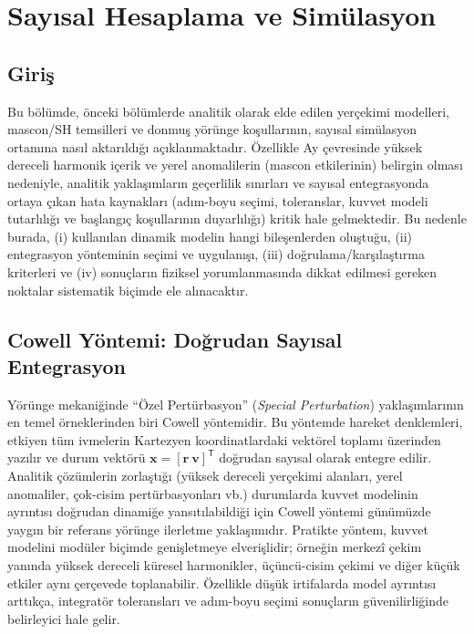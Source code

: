 \chapter{Sayısal Hesaplama ve Simülasyon}

\section{Giriş}
Bu bölümde, önceki bölümlerde analitik olarak elde edilen yerçekimi modelleri, mascon/SH temsilleri ve donmuş
yörünge koşullarının, sayısal simülasyon ortamına nasıl aktarıldığı açıklanmaktadır. Özellikle Ay çevresinde
yüksek dereceli harmonik içerik ve yerel anomalilerin (mascon etkilerinin) belirgin olması nedeniyle, analitik
yaklaşımların geçerlilik sınırları ve sayısal entegrasyonda ortaya çıkan hata kaynakları (adım-boyu seçimi,
toleranslar, kuvvet modeli tutarlılığı ve başlangıç koşullarının duyarlılığı) kritik hale gelmektedir.
Bu nedenle burada, (i) kullanılan dinamik modelin hangi bileşenlerden oluştuğu, (ii) entegrasyon yönteminin
seçimi ve uygulanışı, (iii) doğrulama/karşılaştırma kriterleri ve (iv) sonuçların fiziksel yorumlanmasında
dikkat edilmesi gereken noktalar sistematik biçimde ele alınacaktır.




\newpage
\section{Cowell Yöntemi: Doğrudan Sayısal Entegrasyon}

Yörünge mekaniğinde ``Özel Pertürbasyon'' (\textit{Special Perturbation}) yaklaşımlarının en temel örneklerinden biri
Cowell yöntemidir. Bu yöntemde hareket denklemleri, etkiyen tüm ivmelerin Kartezyen koordinatlardaki vektörel toplamı
üzerinden yazılır ve durum vektörü $\mathbf{x}=[\mathbf{r}\ \mathbf{v}]^{\mathsf T}$ doğrudan sayısal olarak entegre edilir.
Analitik çözümlerin zorlaştığı (yüksek dereceli yerçekimi alanları, yerel anomaliler, çok-cisim pertürbasyonları vb.)
durumlarda kuvvet modelinin ayrıntısı doğrudan dinamiğe yansıtılabildiği için Cowell yöntemi günümüzde yaygın bir
referans yörünge ilerletme yaklaşımıdır. Pratikte yöntem, kuvvet modelini modüler biçimde genişletmeye elverişlidir;
örneğin merkezî çekim yanında yüksek dereceli küresel harmonikler, üçüncü-cisim çekimi ve diğer küçük etkiler aynı çerçevede toplanabilir. Özellikle düşük irtifalarda model ayrıntısı arttıkça, integratör toleransları ve adım-boyu seçimi sonuçların güvenilirliğinde belirleyici hale gelir.


